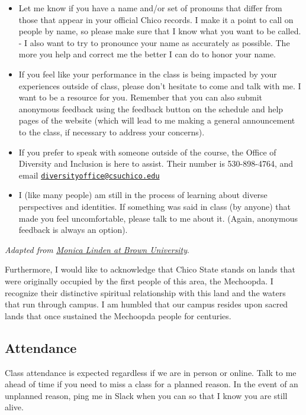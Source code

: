 \documentclass[
]{article}
\providecommand{\tightlist}{%
  \setlength{\itemsep}{0pt}\setlength{\parskip}{0pt}}
\begin{document}
\begin{itemize}
\tightlist
\item
  Let me know if you have a name and/or set of pronouns that differ from
  those that appear in your official Chico records. I make it a point to
  call on people by name, so please make sure that I know what you want
  to be called. - I also want to try to pronounce your name as
  accurately as possible. The more you help and correct me the better I
  can do to honor your name.
\item
  If you feel like your performance in the class is being impacted by
  your experiences outside of class, please don't hesitate to come and
  talk with me. I want to be a resource for you. Remember that you can
  also submit anonymous feedback using the feedback button on the
  schedule and help pages of the website (which will lead to me making a
  general announcement to the class, if necessary to address your
  concerns).
\item
  If you prefer to speak with someone outside of the course, the Office
  of Diversity and Inclusion is here to assist. Their number is
  530-898-4764, and email
  \href{mailto:diversityoffice@csuchico.edu}{\nolinkurl{diversityoffice@csuchico.edu}}
\item
  I (like many people) am still in the process of learning about diverse
  perspectives and identities. If something was said in class (by
  anyone) that made you feel uncomfortable, please talk to me about it.
  (Again, anonymous feedback is always an option).
\end{itemize}

\emph{Adapted from
\href{https://www.brown.edu/sheridan/teaching-learning-resources/inclusive-teaching/statements}{Monica
Linden at Brown University}}.

Furthermore, I would like to acknowledge that Chico State stands on
lands that were originally occupied by the first people of this area,
the Mechoopda. I recognize their distinctive spiritual relationship with
this land and the waters that run through campus. I am humbled that our
campus resides upon sacred lands that once sustained the Mechoopda
people for centuries.

\hypertarget{attendance}{%
\subsection{Attendance}\label{attendance}}

Class attendance is expected regardless if we are in person or online.
Talk to me ahead of time if you need to miss a class for a planned
reason. In the event of an unplanned reason, ping me in Slack when you
can so that I know you are still alive.
\end{document}
